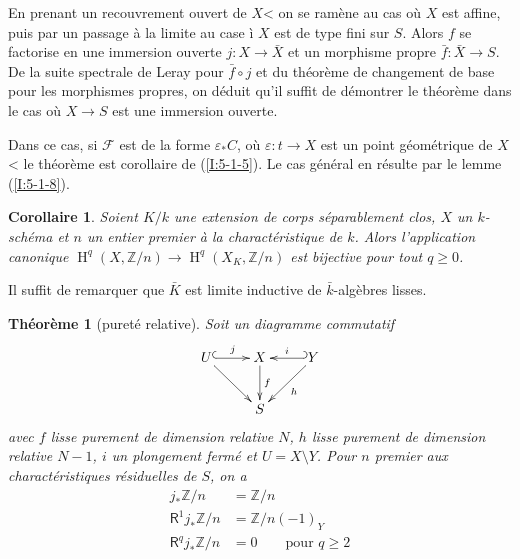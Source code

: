 \documentclass{book}
\DeclareMathOperator{\h}{H}
\newcommand{\cF}{\mathcal{F}}
\newcommand{\dZ}{\mathbb{Z}}
\newcommand{\R}{\mathsf{R}}
\newtheorem{corollary}[subsubsection]{Corollaire}
\newtheorem{theorem}[subsubsection]{Théorème}
\begin{document}
En prenant un recouvrement ouvert de $X$< on se ramène au cas où $X$ est 
affine, puis par un passage à la limite au case \`i $X$ est de type fini sur 
$S$. Alors $f$ se factorise en une immersion ouverte $j:X\to \bar X$ et un 
morphisme propre $\bar f:\bar X\to S$. De la suite spectrale de Leray pour 
$\bar f\circ j$ et du théorème de changement de base pour les morphismes 
propres, on déduit qu'il suffit de démontrer le théorème dans le cas 
où $X\to S$ est une immersion ouverte. 

Dans ce cas, si $\cF$ est de la forme $\varepsilon_* C$, où 
$\varepsilon:t\to X$ est un point géométrique de $X$< le théorème est 
corollaire de (\ref{I:5-1-5}). Le cas général en résulte par le lemme 
(\ref{I:5-1-8}). 





\begin{corollary}\label{I:5-3-3}
Soient $K/k$ une extension de corps séparablement clos, $X$ un $k$-schéma 
et $n$ un entier premier à la charactéristique de $k$. Alors l'application 
canonique $\h^q(X,\dZ/n) \to \h^q(X_K,\dZ/n)$ est bijective pour tout 
$q\geqslant 0$. 
\end{corollary}

Il suffit de remarquer que $\bar K$ est limite inductive de $\bar k$-algèbres 
lisses. 





\begin{theorem}[pureté relative]\label{I:5-3-4}
Soit un diagramme commutatif 
\begin{equation}\label{I:eq:7}\xymatrix{
  U \ar@{^{(}->}[r]^-j \ar[dr]
    & X \ar[d]^-f 
    & \ar@{_{(}->}[l]_-i Y \ar[dl]^-h \\
  & S
}\end{equation}
avec $f$ lisse purement de dimension relative $N$, $h$ lisse purement de 
dimension relative $N-1$, $i$ un plongement fermé et $U=X\setminus Y$. Pour 
$n$ premier aux charactéristiques résiduelles de $S$, on a 
\begin{equation*}
\begin{aligned}
  j_* \dZ/n     &= \dZ/n \\
  \R^1 j_*\dZ/n &= \dZ/n(-1)_Y \\
  \R^q j_*\dZ/n &= 0 \qquad \text{pour $q\geqslant 2$}
\end{aligned}
\end{equation*}
\end{theorem}
\end{document}

